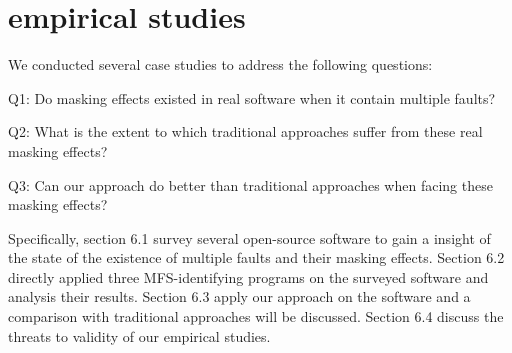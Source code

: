 \documentclass{sig-alternate}
\begin{document}
%
%

\section{empirical studies}
We conducted several case studies to address the following questions:

Q1: Do masking effects existed in real software when it contain multiple faults?

Q2: What is the extent to which traditional approaches suffer from these real masking effects?

Q3: Can our approach do better than traditional approaches when facing these masking effects?

Specifically, section 6.1 survey several open-source software to gain a insight of the state of the existence of multiple faults and their masking effects. Section 6.2 directly applied three MFS-identifying programs on the surveyed software and analysis their results. Section 6.3 apply our approach on the software and a comparison with traditional approaches will be discussed. Section 6.4 discuss the threats to validity of our empirical studies.
\end{document}

